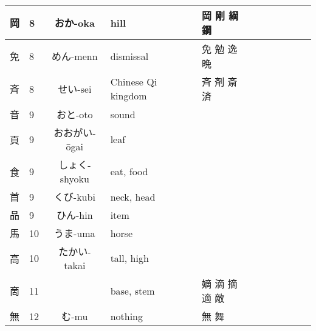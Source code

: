 \documentclass{article}
\begin{document}
{\begin{longtable}{|Cp{1.2cm}|Cp{0.3cm}|Cp{3cm}|Cp{5cm}|Cp{0.5cm}|Cp{5cm}|}
  岡 & 8 & おか-oka & hill &  & 岡 剛 綱 鋼 \\ \hline
  免 & 8 & めん-menn & dismissal &  & 免 勉 逸 晩 \\ \hline
  斉 & 8 & せい-sei & Chinese Qi kingdom &  & 斉 剤 斎 済 \\ \hline
  音 & 9 & おと-oto & sound &  &  \\ \hline
  頁 & 9 & おおがい-ōgai & leaf &  &  \\ \hline
  食 & 9 & しょく-shyoku & eat, food &  &  \\ \hline
  首 & 9 & くび-kubi & neck, head &  &  \\ \hline
  品 & 9 & ひん-hin & item &  &  \\ \hline
  馬 & 10 & うま-uma & horse &  &  \\ \hline
  高 & 10 & たかい-takai & tall, high &  &  \\ \hline
  啇 & 11 &  & base, stem &  & 嫡 滴 摘 適 敵 \\ \hline
  無 & 12 & む-mu & nothing &  & 無 舞 \\  \hline
  \end{longtable}
}
\end{document}
